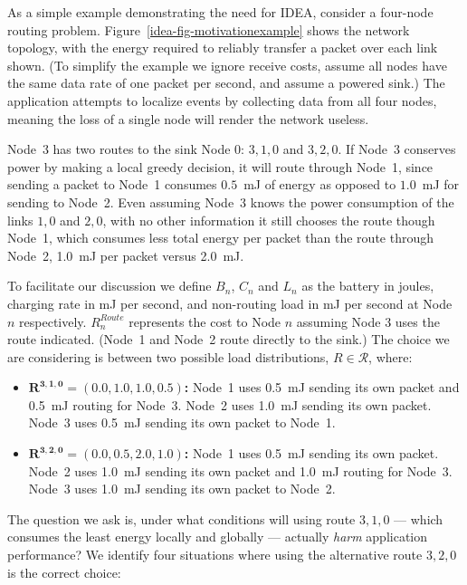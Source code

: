 As a simple example demonstrating the need for IDEA, consider a four-node
routing problem. Figure~\ref{idea-fig-motivationexample} shows the network
topology, with the energy required to reliably transfer a packet over each
link shown. (To simplify the example we ignore receive costs, assume all
nodes have the same data rate of one packet per second, and assume a powered
sink.) The application attempts to localize events by collecting data from
all four nodes, meaning the loss of a single node will render the network
useless.

Node~3 has two routes to the sink Node 0: $3,1,0$ and $3,2,0$. If Node~3
conserves power by making a local greedy decision, it will route through
Node~1, since sending a packet to Node~1 consumes $0.5$~mJ of energy as
opposed to $1.0$~mJ for sending to Node~2. Even assuming Node~3 knows the
power consumption of the links $1,0$ and $2,0$, with no other information it
still chooses the route though Node~1, which consumes less total energy per
packet than the route through Node~2, 1.0~mJ per packet versus 2.0~mJ.

To facilitate our discussion we define $B_n$, $C_n$ and $L_n$ as the
battery in joules, charging rate in mJ per second, and non-routing load in mJ
per second at Node $n$ respectively.  $R^{Route}_n$ represents the cost to
Node $n$ assuming Node 3 uses the route indicated.  (Node~1 and Node~2 route
directly to the sink.) The choice we are considering is between two possible
load distributions, $R \in \mathcal{R}$, where:

\begin{itemize}

\item \textbf{$\mathbf{R^{3,1,0} = (0.0, 1.0, 1.0, 0.5)}$:} Node~1 uses 0.5~mJ sending
its own packet and 0.5~mJ routing for Node~3. Node~2 uses 1.0~mJ sending its
own packet. Node~3 uses 0.5~mJ sending its own packet to Node~1.
\vspace{-0.1in}
\item \textbf{$\mathbf{R^{3,2,0} = (0.0, 0.5, 2.0, 1.0)}$:} Node~1 uses 0.5~mJ
sending its own packet. Node~2 uses 1.0~mJ sending its own packet and 1.0~mJ
routing for Node~3. Node~3 uses 1.0~mJ sending its own packet to Node~2.

\end{itemize}

The question we ask is, under what conditions will using route $3,1,0$ ---
which consumes the least energy locally and globally --- actually
\textit{harm} application performance?  We identify four situations where
using the alternative route $3,2,0$ is the correct choice:

